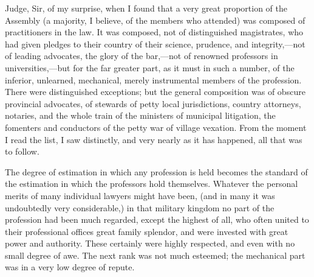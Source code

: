 Judge, Sir, of my surprise, when I found that a very great proportion of the Assembly (a majority, I believe, of the members who attended) was composed of practitioners in the law. It was composed, not of distinguished magistrates, who had given pledges to their country of their science, prudence, and integrity,—not of leading advocates, the glory of the bar,—not of renowned professors in universities,—but for the far greater part, as it must in such a number, of the inferior, unlearned, mechanical, merely instrumental members of the profession. There were distinguished exceptions; but the general composition was of obscure provincial advocates, of stewards of petty local jurisdictions, country attorneys, notaries, and the whole train of the ministers of municipal litigation, the fomenters and conductors of the petty war of village vexation. From the moment I read the list, I saw distinctly, and very nearly as it has happened, all that was to follow.

The degree of estimation in which any profession is held becomes the standard of the estimation in which the professors hold themselves. Whatever the personal merits of many individual lawyers might have been, (and in many it was undoubtedly very considerable,) in that military kingdom no part of the profession had been much regarded, except the highest of all, who often united to their professional offices great family splendor, and were invested with great power and authority. These certainly were highly respected, and even with no small degree of awe. The next rank was not much esteemed; the mechanical part was in a very low degree of repute.

